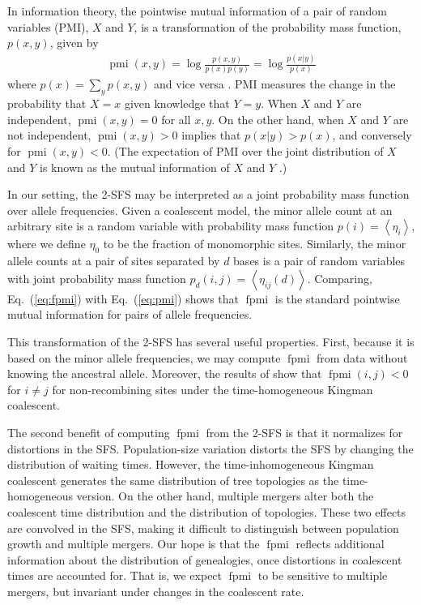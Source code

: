 \documentclass[11pt, letterpaper]{article}   	%
\newcommand{\eq}[1]{Eq.~(\ref{#1})}
\newcommand{\E}[1]{\left< #1 \right>}
\DeclareMathOperator{\pmi}{pmi}
\DeclareMathOperator{\fpmi}{fpmi}
\begin{document}
In information theory, the pointwise mutual information of a pair of random variables (PMI), $X$ and $Y$, is a transformation of the probability mass function, $p(x,y)$, given by
\begin{align}
    \pmi(x,y) = \log \frac{p(x,y)}{p(x)p(y)} = \log \frac{p(x|y)}{p(x)}
    \label{eq:pmi}
\end{align}
where $p(x) = \sum_y p(x,y)$ and vice versa \autocite{ChurchHanks1990}.
PMI measures the change in the probability that $X=x$ given knowledge that $Y=y$.
When $X$ and $Y$ are independent, $\pmi(x,y) = 0$ for all $x,y$.
On the other hand, when $X$ and $Y$ are not independent, $\pmi(x,y) > 0$ implies that $p(x|y) > p(x)$, and conversely for $\pmi(x,y) < 0$.
(The expectation of PMI over the joint distribution of $X$ and $Y$ is known as the mutual information of $X$ and $Y$ \autocite{CoverThomas1991}.)

In our setting, the 2-SFS may be interpreted as a joint probability mass function over allele frequencies.
Given a coalescent model, the minor allele count at an arbitrary site is a random variable with probability mass function $p(i) = \E{\eta_i}$, where we define $\eta_0$ to be the fraction of monomorphic sites.
Similarly, the minor allele counts at a pair of sites separated by $d$ bases is a pair of random variables with joint probability mass function $p_d(i,j) = \E{\eta_{ij}(d)}$.
Comparing, \eq{eq:fpmi} with \eq{eq:pmi} shows that $\fpmi$ is the standard pointwise mutual information for pairs of allele frequencies.

This transformation of the 2-SFS has several useful properties.
First, because it is based on the minor allele frequencies, we may compute $\fpmi$ from data without knowing the ancestral allele.
Moreover, the results of \cite{Fu1995} show that $\fpmi(i,j) < 0$ for $i\neq j$ for non-recombining sites under the time-homogeneous Kingman coalescent.

The second benefit of computing $\fpmi$ from the 2-SFS is that it normalizes for distortions in the SFS.
Population-size variation distorts the SFS by changing the distribution of waiting times.
However, the time-inhomogeneous Kingman coalescent generates the same distribution of tree topologies as the time-homogeneous version.
On the other hand, multiple mergers alter both the coalescent time distribution and the distribution of topologies.
These two effects are convolved in the SFS, making it difficult to distinguish between population growth and multiple mergers.
Our hope is that the $\fpmi$ reflects additional information about the distribution of genealogies, once distortions in coalescent times are accounted for.
That is, we expect $\fpmi$ to be sensitive to multiple mergers, but invariant under changes in the coalescent rate.
\end{document}
